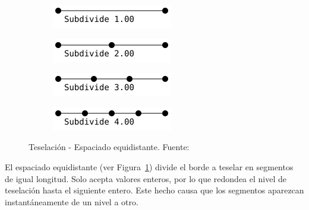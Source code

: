 \begin{figure}[h]
	\centering
	\begin{subfigure}{.45\textwidth}
			\includegraphics[width=\textwidth]{figures/equal1.png}	
	\end{subfigure}	
	\hfill
	\begin{subfigure}{.45\textwidth}
			\includegraphics[width=\textwidth]{figures/equal2.png}	
	\end{subfigure}	
	\newline
	\begin{subfigure}{.45\textwidth}
			\includegraphics[width=\textwidth]{figures/equal3.png}	
	\end{subfigure}	
	\hfill
	\begin{subfigure}{.45\textwidth}
			\includegraphics[width=\textwidth]{figures/equal4.png}	
	\end{subfigure}	
	\caption[Teselación - Espaciado equidistante.]{Teselación - Espaciado
	equidistante. Fuente:~\cite{TessellationImages}}
	\label{fig3.2}
\end{figure}

El espaciado equidistante (ver Figura~\ref{fig3.2}) divide el borde a teselar
en segmentos de igual longitud. Solo acepta valores enteros, por lo que redondea
el nivel de teselación hasta el siguiente entero. Este hecho causa que los
segmentos aparezcan instantáneamente de un nivel a otro.


